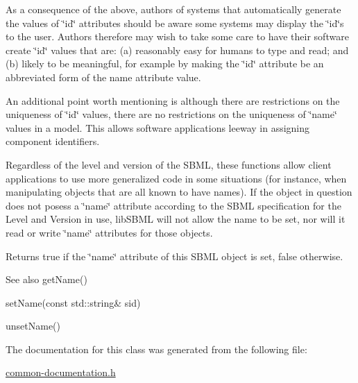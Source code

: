 As a consequence of the above, authors of systems that automatically generate the values of \char`\"{}id\char`\"{} attributes should be aware some systems may display the \char`\"{}id\char`\"{}\textquotesingle{}s to the user. Authors therefore may wish to take some care to have their software create \char`\"{}id\char`\"{} values that are\+: (a) reasonably easy for humans to type and read; and (b) likely to be meaningful, for example by making the \char`\"{}id\char`\"{} attribute be an abbreviated form of the name attribute value.

An additional point worth mentioning is although there are restrictions on the uniqueness of \char`\"{}id\char`\"{} values, there are no restrictions on the uniqueness of \char`\"{}name\char`\"{} values in a model. This allows software applications leeway in assigning component identifiers.

Regardless of the level and version of the S\+B\+ML, these functions allow client applications to use more generalized code in some situations (for instance, when manipulating objects that are all known to have names). If the object in question does not posess a \char`\"{}name\char`\"{} attribute according to the S\+B\+ML specification for the Level and Version in use, lib\+S\+B\+ML will not allow the name to be set, nor will it read or write \char`\"{}name\char`\"{} attributes for those objects.

\begin{DoxyReturn}{Returns}
{\ttfamily true} if the \char`\"{}name\char`\"{} attribute of this S\+B\+ML object is set, {\ttfamily false} otherwise.
\end{DoxyReturn}
\begin{DoxySeeAlso}{See also}
get\+Name() 

set\+Name(const std\+::string\& sid) 

unset\+Name() 
\end{DoxySeeAlso}


The documentation for this class was generated from the following file\+:\begin{DoxyCompactItemize}
\item 
\hyperlink{common-documentation_8h}{common-\/documentation.\+h}\end{DoxyCompactItemize}
